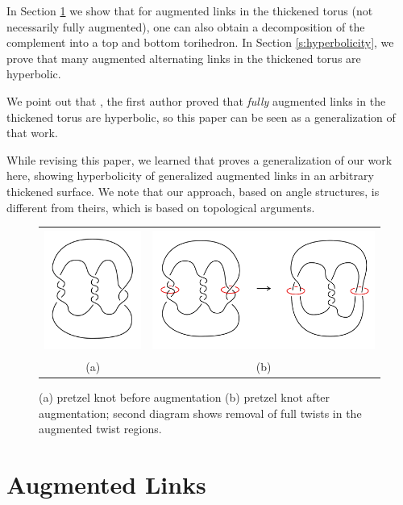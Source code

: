 \documentclass[11pt]{amsart}
\newcommand{\secref}[1]{Section \ref{#1}}
\theoremstyle{plain}
\theoremstyle{definition}
\begin{document}
In \secref{s:auglinks} we show that for augmented
links in the thickened torus (not necessarily fully augmented),
one can also obtain a decomposition of the
complement into a top and bottom torihedron.
In \secref{s:hyperbolicity}, we prove that
many augmented alternating links in the thickened torus are hyperbolic.


We point out that \cite{kwon2020fully}, the first author
proved that \emph{fully} augmented links in the thickened torus
are hyperbolic, so this paper can be seen as a generalization
of that work.


While revising this paper, we learned that \cite{adams2021generalized}
proves a generalization of our work here,
showing hyperbolicity of generalized augmented links
in an arbitrary thickened surface.
We note that our approach, based on angle structures,
is different from theirs, which is based on topological arguments.



\begin{figure}
\centering  
\begin{tabular}{cc}
\includegraphics[height=4cm]{augmentation1.png}
\;\;\;\;
& \includegraphics[height=4cm]{augmentation2.png}
\\
(a)
& (b)
\end{tabular}
\caption{(a) pretzel knot before augmentation
(b) pretzel knot after augmentation;
second diagram shows
removal of full twists in the augmented twist regions.}
\label{fig:augmentationS3}
\end{figure}
 
 
\section{Augmented Links}
\label{s:auglinks}
\end{document}

